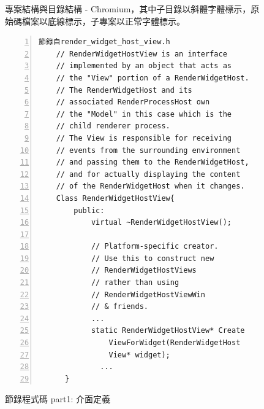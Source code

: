 \documentclass[10pt, twocolumn]{article}
\begin{document}
\begin{figure}
\begin{sideways}
\end{sideways}		
\begin{center}
\caption{專案結構與目錄結構 - Chromium，其中子目錄以斜體字體標示，原始碼檔案以底線標示，子專案以正常字體標示。}
\label{fig-folderstructure}
\end{center}
\end{figure}

\begin{figure}
\fontsize{8pt}{8pt}\selectfont
\begin{Verbatim}[numbers=left,framesep=1mm,numbersep=-12pt]
	節錄自render_widget_host_view.h
	// RenderWidgetHostView is an interface 
	// implemented by an object that acts as
	// the "View" portion of a RenderWidgetHost.
	// The RenderWidgetHost and its
	// associated RenderProcessHost own
	// the "Model" in this case which is the
	// child renderer process.
	// The View is responsible for receiving
	// events from the surrounding environment
	// and passing them to the RenderWidgetHost,
	// and for actually displaying the content
	// of the RenderWidgetHost when it changes.
	Class RenderWidgetHostView{
	    public:
	        virtual ~RenderWidgetHostView();
	        
	        // Platform-specific creator.
	        // Use this to construct new 
	        // RenderWidgetHostViews
	        // rather than using 
	        // RenderWidgetHostViewWin 
	        // & friends.
	        ...
	        static RenderWidgetHostView* Create
	            ViewForWidget(RenderWidgetHost
	            View* widget);
	          ...
	  }
\end{Verbatim}
\caption{節錄程式碼 part1: 介面定義}
\label{interfacedef}
\end{figure}
\end{document}
